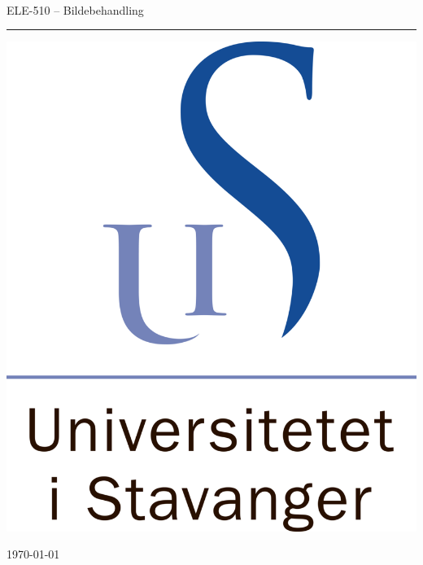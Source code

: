 \begin{titlepage}

    \begin{center}
        
        ~\\[1.0cm]
        
        \Large ELE-510 -- Bildebehandling\\[2.5cm]
         
        {\LARGE \textbf{\MakeUppercase{\mytitle}}}
        \vspace{0.5cm}
        \hrule
        
        \vspace{1.0cm}
        \large {\myauthor} 
        \vspace{4.0cm}
        
        \includegraphics[scale=0.1]{img/standard_uis.png}
        
        \vspace{0.5cm}
        
    	{\large \today\par}
        
    \end{center}

\end{titlepage}